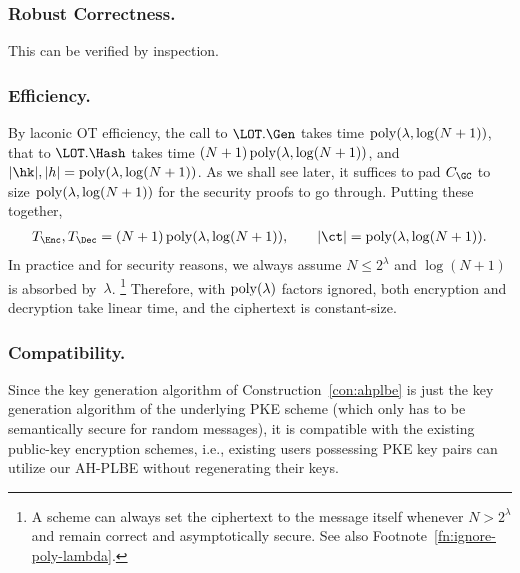 \subsubsection{Robust Correctness.}
This can be verified by inspection.

\subsubsection{Efficiency.}
By laconic OT efficiency,
the call to
$\LOT.\Gen$ takes time ${\operatorname{poly}(\lambda,\log(N+1))}$,
that to
$\LOT.\Hash$ takes time ${(N+1)\operatorname{poly}(\lambda,\log(N+1))}$, and
${|\hk|,|h|=\poly(\lambda,\log(N+1))}$.
As we shall see later, it suffices to pad $C_\GC$ to size ${\operatorname{poly}(\lambda,\log(N+1))}$ for the security proofs to go through.
Putting these together,
\begin{align*}
T_\Enc,T_\Dec
=
(N+1)\poly(\lambda,\log(N+1)),
\qquad
|\ct|
=
\poly(\lambda,\log(N+1)).
\end{align*}
In practice and for security reasons,
we always assume ${N\leq 2^\lambda}$ and ${\log(N+1)}$ is absorbed by~$\lambda$.%
\footnote{%
A scheme can always set the ciphertext to the message itself
whenever ${N>2^\lambda}$ and
remain correct and asymptotically secure.
See also Footnote~\ref{fn:ignore-poly-lambda}.}
Therefore, with $\operatorname{poly}(\lambda)$ factors ignored,
both encryption and decryption take linear time,
and the ciphertext is constant-size.

\subsubsection{Compatibility.}
Since the key generation algorithm of Construction~\ref{con:ahplbe} is just the key generation algorithm of the underlying PKE scheme (which only has to be semantically secure for random messages),
it is compatible with the existing public-key encryption schemes,
i.e., existing users possessing PKE key pairs can utilize our AH-PLBE without regenerating their keys.

